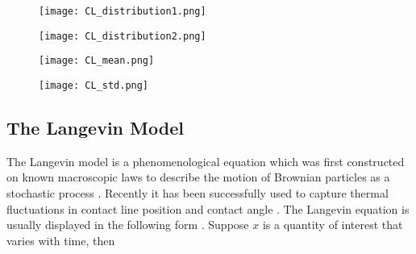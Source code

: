 \documentclass[
reprint,
 amsmath,amssymb,
 aps,
url
]{revtex4-1}
\begin{document}
\begin{figure*}[t]
	\centering
	\begin{subfigure}[b]{0.45\linewidth}
		\caption{}
		\texttt{[image: CL\_distribution1.png]}
	\end{subfigure}
	\begin{subfigure}[b]{0.45\linewidth}
		\caption{}
		\texttt{[image: CL\_distribution2.png]}
	\end{subfigure}
	\begin{subfigure}[b]{0.45\linewidth}
		\caption{}
		\texttt{[image: CL\_mean.png]}
	\end{subfigure}	
	\begin{subfigure}[b]{0.45\linewidth}
		\caption{}
		\texttt{[image: CL\_std.png]}
	\end{subfigure}
	\caption{\label{fig:CL} Results Gaussian distribution fitting of the time series of free surface position $z_f$ with different coupling parameter $C_{SL}=0.5$-$0.9$. The method of fitting is trust region reflective algorithm and error bars are obtained accordingly. (a) shows the time series of $z_f(x)$ at $x=10.15,124.6,65.58$ \si{\angstrom} and (b) shows the probability density functions after fittings them to the Gaussian distribution with $C_{SL}=0.9$. (c) and (d) show the change of the mean free surface position $\mu_f$ and the standard deviation of free surface position $\sigma_f$ with $x$ for different $C_{SL}$.}
\end{figure*}

\subsection{The Langevin Model}

The Langevin model is a phenomenological equation which was first constructed on known macroscopic laws to describe the motion of Brownian particles as a stochastic process \cite{kampen_stochastic_2007}. Recently it has been successfully used to capture thermal fluctuations in  contact line position \cite{fernandez-toledano_contact-line_2019} and contact angle \cite{smith_langevin_2016}. The Langevin equation is usually displayed in the following form \cite{feldman_theory_1989}. Suppose $x$ is a quantity of interest that varies with time, then
 
\end{document}
